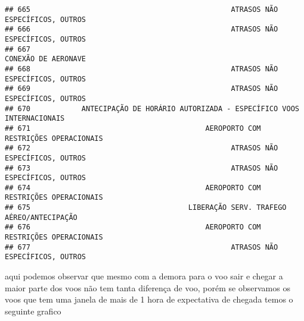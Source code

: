 \documentclass[
]{article}
\begin{document}
\begin{verbatim}
## 665                                               ATRASOS NÃO ESPECÍFICOS, OUTROS
## 666                                               ATRASOS NÃO ESPECÍFICOS, OUTROS
## 667                                                           CONEXÃO DE AERONAVE
## 668                                               ATRASOS NÃO ESPECÍFICOS, OUTROS
## 669                                               ATRASOS NÃO ESPECÍFICOS, OUTROS
## 670            ANTECIPAÇÃO DE HORÁRIO AUTORIZADA - ESPECÍFICO VOOS INTERNACIONAIS
## 671                                         AEROPORTO COM RESTRIÇÕES OPERACIONAIS
## 672                                               ATRASOS NÃO ESPECÍFICOS, OUTROS
## 673                                               ATRASOS NÃO ESPECÍFICOS, OUTROS
## 674                                         AEROPORTO COM RESTRIÇÕES OPERACIONAIS
## 675                                     LIBERAÇÃO SERV. TRAFEGO AÉREO/ANTECIPAÇÃO
## 676                                         AEROPORTO COM RESTRIÇÕES OPERACIONAIS
## 677                                               ATRASOS NÃO ESPECÍFICOS, OUTROS
\end{verbatim}

aqui podemos observar que mesmo com a demora para o voo sair e chegar a
maior parte dos voos não tem tanta diferença de voo, porém se observamos
os voos que tem uma janela de mais de 1 hora de expectativa de chegada
temos o seguinte grafico
\end{document}
